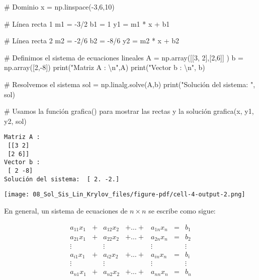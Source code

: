 \documentclass[
  letterpaper,
  DIV=11,
  numbers=noendperiod]{scrreprt}
\newenvironment{Shaded}{\begin{snugshade}}{\end{snugshade}}
\newcommand{\BuiltInTok}[1]{\textcolor[rgb]{0.00,0.23,0.31}{#1}}
\newcommand{\CharTok}[1]{\textcolor[rgb]{0.13,0.47,0.30}{#1}}
\newcommand{\CommentTok}[1]{\textcolor[rgb]{0.37,0.37,0.37}{#1}}
\newcommand{\DecValTok}[1]{\textcolor[rgb]{0.68,0.00,0.00}{#1}}
\newcommand{\NormalTok}[1]{\textcolor[rgb]{0.00,0.23,0.31}{#1}}
\newcommand{\OperatorTok}[1]{\textcolor[rgb]{0.37,0.37,0.37}{#1}}
\newcommand{\StringTok}[1]{\textcolor[rgb]{0.13,0.47,0.30}{#1}}
\begin{document}
\begin{Shaded}
\begin{Highlighting}[]
\CommentTok{\# Dominio}
\NormalTok{x }\OperatorTok{=}\NormalTok{ np.linspace(}\OperatorTok{{-}}\DecValTok{3}\NormalTok{,}\DecValTok{6}\NormalTok{,}\DecValTok{10}\NormalTok{)}

\CommentTok{\# Línea recta 1}
\NormalTok{m1 }\OperatorTok{=} \OperatorTok{{-}}\DecValTok{3}\OperatorTok{/}\DecValTok{2}
\NormalTok{b1 }\OperatorTok{=} \DecValTok{1}
\NormalTok{y1 }\OperatorTok{=}\NormalTok{ m1 }\OperatorTok{*}\NormalTok{ x }\OperatorTok{+}\NormalTok{ b1}

\CommentTok{\# Línea recta 2}
\NormalTok{m2 }\OperatorTok{=} \OperatorTok{{-}}\DecValTok{2}\OperatorTok{/}\DecValTok{6}
\NormalTok{b2 }\OperatorTok{=} \OperatorTok{{-}}\DecValTok{8}\OperatorTok{/}\DecValTok{6}
\NormalTok{y2 }\OperatorTok{=}\NormalTok{ m2 }\OperatorTok{*}\NormalTok{ x }\OperatorTok{+}\NormalTok{ b2 }

\CommentTok{\# Definimos el sistema de ecuaciones lineales}
\NormalTok{A }\OperatorTok{=}\NormalTok{ np.array([[}\DecValTok{3}\NormalTok{, }\DecValTok{2}\NormalTok{],[}\DecValTok{2}\NormalTok{,}\DecValTok{6}\NormalTok{]] )}
\NormalTok{b }\OperatorTok{=}\NormalTok{ np.array([}\DecValTok{2}\NormalTok{,}\OperatorTok{{-}}\DecValTok{8}\NormalTok{])}
\BuiltInTok{print}\NormalTok{(}\StringTok{"Matriz A : }\CharTok{\textbackslash{}n}\StringTok{"}\NormalTok{,A)}
\BuiltInTok{print}\NormalTok{(}\StringTok{"Vector b : }\CharTok{\textbackslash{}n}\StringTok{"}\NormalTok{, b)}

\CommentTok{\# Resolvemos el sistema}
\NormalTok{sol }\OperatorTok{=}\NormalTok{ np.linalg.solve(A,b)}
\BuiltInTok{print}\NormalTok{(}\StringTok{"Solución del sistema: "}\NormalTok{, sol)}

\CommentTok{\# Usamos la función grafica() para mostrar las rectas y la solución}
\NormalTok{grafica(x, y1, y2, sol)}
\end{Highlighting}
\end{Shaded}

\begin{verbatim}
Matriz A : 
 [[3 2]
 [2 6]]
Vector b : 
 [ 2 -8]
Solución del sistema:  [ 2. -2.]
\end{verbatim}

\texttt{[image: 08\_Sol\_Sis\_Lin\_Krylov\_files/figure-pdf/cell-4-output-2.png]}

En general, un sistema de ecuaciones de \(n \times n\) se escribe como
sigue:

\[
\begin{array}{ccccccc}
a_{11}x_1 & + & a_{12}x_2 & +  \dots  + & a_{1n}x_n & = & b_1 \\
a_{21}x_1 & + & a_{22}x_2 & +  \dots + & a_{2n}x_n & = & b_2 \\
\vdots & & \vdots &  & \vdots & & \vdots \\
a_{i1}x_1 & + & a_{i2}x_2 & +  \dots + & a_{in}x_n & = & b_i \\
\vdots & & \vdots &  & \vdots & & \vdots \\
a_{n1}x_1 & + & a_{n2}x_2 & + \dots + & a_{nn}x_n & = & b_n
\end{array}
\]
\end{document}

